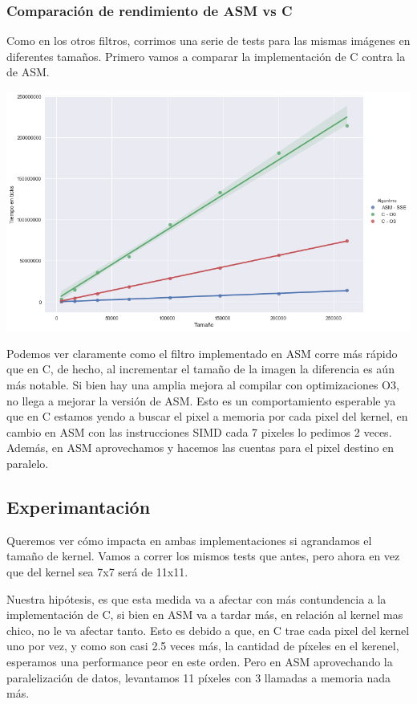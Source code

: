 \subsubsection*{Comparación de rendimiento de ASM vs C}
Como en los otros filtros, corrimos una serie de tests para las mismas imágenes en diferentes tamaños. Primero vamos a comparar la implementación de C contra la de ASM.

\begin{center}
	\includegraphics[scale=0.5]{img/maxCloser_CvsASMvsO3.png}
\end{center}

Podemos ver claramente como el filtro implementado en ASM corre más rápido que en C, de hecho, al incrementar el tamaño de la imagen la diferencia es aún más notable. Si bien hay una amplia mejora al compilar con optimizaciones O3, no llega a mejorar la versión de ASM. Esto es un comportamiento esperable ya que en C estamos yendo a buscar el pixel a memoria por cada pixel del kernel, en cambio en ASM con las instrucciones SIMD cada 7 pixeles lo pedimos 2 veces. Además, en ASM aprovechamos y hacemos las cuentas para el pixel destino en paralelo.

\subsection{Experimantación}
Queremos ver cómo impacta en ambas implementaciones si agrandamos el tamaño de kernel. Vamos a correr los mismos tests que antes, pero ahora en vez que del kernel sea 7x7 será de 11x11.

Nuestra hipótesis, es que esta medida va a afectar con más contundencia a la implementación de C, si bien en ASM va a tardar más, en relación al kernel mas chico, no le va afectar tanto. Esto es debido a que, en C trae cada pixel del kernel uno por vez, y como son casi 2.5 veces más, la cantidad de píxeles en el kerenel, esperamos una performance peor en este orden. Pero en ASM aprovechando la paralelización de datos, levantamos 11 píxeles con 3 llamadas a memoria nada más.

